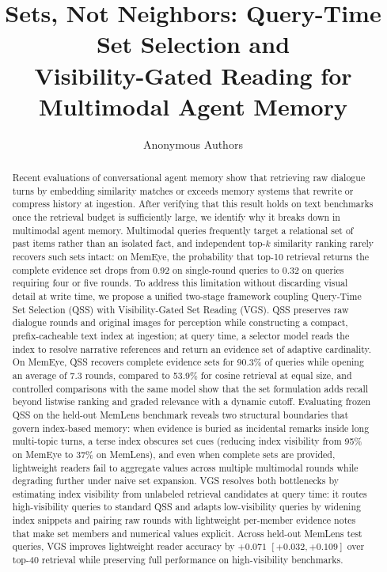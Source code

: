 \documentclass[10pt]{article}
\title{Sets, Not Neighbors: Query-Time Set Selection and\\Visibility-Gated Reading for Multimodal Agent Memory}
\author{Anonymous Authors}
\date{}
\newcommand{\qss}{QSS}
\begin{document}
\maketitle

\begin{abstract}
Recent evaluations of conversational agent memory show that retrieving raw dialogue turns by embedding similarity matches or exceeds memory systems that rewrite or compress history at ingestion. After verifying that this result holds on text benchmarks once the retrieval budget is sufficiently large, we identify why it breaks down in multimodal agent memory. Multimodal queries frequently target a relational set of past items rather than an isolated fact, and independent top-$k$ similarity ranking rarely recovers such sets intact: on MemEye, the probability that top-10 retrieval returns the complete evidence set drops from 0.92 on single-round queries to 0.32 on queries requiring four or five rounds. To address this limitation without discarding visual detail at write time, we propose a unified two-stage framework coupling Query-Time Set Selection (\qss{}) with Visibility-Gated Set Reading (VGS). \qss{} preserves raw dialogue rounds and original images for perception while constructing a compact, prefix-cacheable text index at ingestion; at query time, a selector model reads the index to resolve narrative references and return an evidence set of adaptive cardinality. On MemEye, \qss{} recovers complete evidence sets for 90.3\% of queries while opening an average of 7.3 rounds, compared to 53.9\% for cosine retrieval at equal size, and controlled comparisons with the same model show that the set formulation adds recall beyond listwise ranking and graded relevance with a dynamic cutoff. Evaluating frozen \qss{} on the held-out MemLens benchmark reveals two structural boundaries that govern index-based memory: when evidence is buried as incidental remarks inside long multi-topic turns, a terse index obscures set cues (reducing index visibility from 95\% on MemEye to 37\% on MemLens), and even when complete sets are provided, lightweight readers fail to aggregate values across multiple multimodal rounds while degrading further under naive set expansion. VGS resolves both bottlenecks by estimating index visibility from unlabeled retrieval candidates at query time: it routes high-visibility queries to standard \qss{} and adapts low-visibility queries by widening index snippets and pairing raw rounds with lightweight per-member evidence notes that make set members and numerical values explicit. Across held-out MemLens test queries, VGS improves lightweight reader accuracy by $+0.071$ $[+0.032, +0.109]$ over top-40 retrieval while preserving full performance on high-visibility benchmarks.
\end{abstract}
\end{document}
